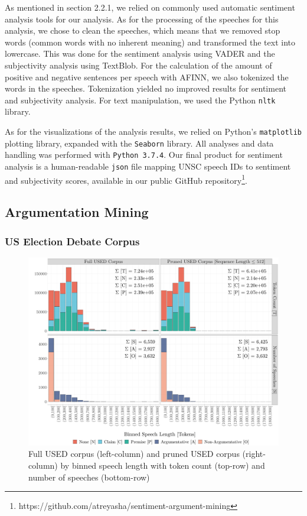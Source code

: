 As mentioned in section 2.2.1, we relied on commonly used automatic sentiment analysis tools for our analysis.  As for the processing of the speeches for this analysis, we chose to clean the speeches, which means that we removed stop words (common words with no inherent meaning) and transformed the text into lowercase. This was done for the sentiment analysis using VADER and the subjectivity analysis using TextBlob. For the calculation of the amount of positive and negative sentences per speech with AFINN, we also tokenized the words in the speeches. Tokenization yielded no improved results for sentiment and subjectivity analysis. For text manipulation, we used the Python \texttt{nltk} library.

As for the visualizations of the analysis results, we relied on Python's \texttt{matplotlib} plotting library, expanded with the \texttt{Seaborn} library. All analyses and data handling was performed with \texttt{Python 3.7.4}.  Our final product for sentiment analysis is a human-readable \texttt{json} file mapping UNSC speech IDs to sentiment and subjectivity scores, available in our public GitHub repository\footnote{https://github.com/atreyasha/sentiment-argument-mining}.

\subsection{Argumentation Mining}
\subsubsection{US Election Debate Corpus}
\label{used}

\begin{figure}[b!]
    \centering
    \includegraphics[trim={1.0cm 0cm 0cm 0cm},clip,width=\textwidth]{img/token_dist_US_length_combined.pdf}
    \caption{Full USED corpus (left-column) and pruned USED corpus (right-column) by binned speech length with token count (top-row) and number of speeches (bottom-row)}
    \label{used_distribution_combined}
\end{figure}

